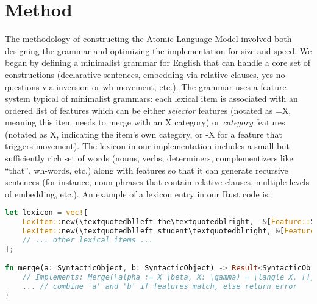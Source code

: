 \documentclass[11pt]{article}
\begin{document}
\section{Method}
\label{sec:method}
The methodology of constructing the Atomic Language Model involved both designing the grammar and optimizing the implementation for size and speed. We began by defining a minimalist grammar for English that can handle a core set of constructions (declarative sentences, embedding via relative clauses, yes-no questions via inversion or wh-movement, etc.). The grammar uses a feature system typical of minimalist grammars: each lexical item is associated with an ordered list of features which can be either \emph{selector} features (notated as =X, meaning this item needs to merge with an X category) or \emph{category} features (notated as X, indicating the item's own category, or -X for a feature that triggers movement). The lexicon in our implementation includes a small but sufficiently rich set of words (nouns, verbs, determiners, complementizers like \textquotedblleft that\textquotedblright, wh-words, etc.) along with features so that it can generate recursive sentences (for instance, noun phrases that contain relative clauses, multiple levels of embedding, etc.). An example of a lexicon entry in our Rust code is:

\begin{lstlisting}[language=Rust, caption={Snippet of the lexicon and merge function}, label={code:merge}]
let lexicon = vec![
    LexItem::new(\textquotedblleft the\textquotedblright,  &[Feature::Sel(Category::N), Feature::Cat(Category::D)]),
    LexItem::new(\textquotedblleft student\textquotedblright, &[Feature::Cat(Category::N)]),
    // ... other lexical items ...
];

fn merge(a: SyntacticObject, b: SyntacticObject) -> Result<SyntacticObject, DerivationError> {
    // Implements: Merge(\alpha :=_X \beta, X: \gamma) = \langle X, [], [\alpha, \gamma]\rangle
    ... // combine 'a' and 'b' if features match, else return error
}
\end{lstlisting}
\end{document}

